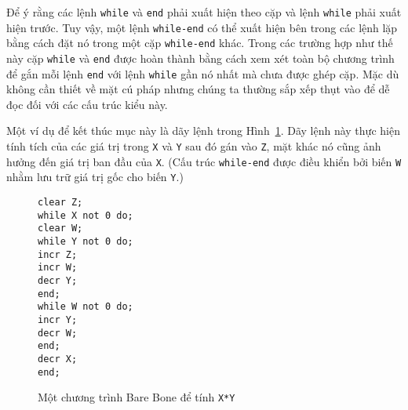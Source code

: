 Để ý rằng các lệnh \texttt{while} và \texttt{end} phải xuất hiện theo cặp và lệnh
\texttt{while} phải xuất hiện trước. Tuy vậy, một lệnh \texttt{while-end} có thể xuất hiện
bên trong các lệnh lặp bằng cách đặt nó trong một cặp \texttt{while-end} khác. Trong các
trường hợp như thế này cặp \texttt{while} và \texttt{end} được hoàn thành bằng cách xem
xét toàn bộ chương trình để gắn mỗi lệnh \texttt{end} với lệnh \texttt{while} gần nó nhất
mà chưa được ghép cặp. Mặc dù không cần thiết về mặt cú pháp nhưng chúng ta thường sắp xếp
thụt vào để dễ đọc đối với các cấu trúc kiểu này.


Một ví dụ để kết thúc mục này là dãy lệnh trong Hình~\ref{fig:fig114}. Dãy lệnh này thực
hiện tính tích của các giá trị trong \texttt{X} và \texttt{Y} sau đó gán vào \texttt{Z},
mặt khác nó cũng ảnh hưởng đến giá trị ban đầu của \texttt{X}. (Cấu trúc
\texttt{while-end} được điều khiển bởi biến \texttt{W} nhằm lưu trữ giá trị gốc cho biến
\texttt{Y}.)

\begin{figure}[tbh]
  \begin{flushleft}
    \qquad \qquad\qquad  \texttt{clear Z;}\\
    \qquad \qquad\qquad \texttt{while X not 0 do;} \\
    \qquad \qquad\qquad \qquad \texttt{clear W;} \\
    \qquad \qquad\qquad \qquad \texttt{while Y not 0 do;} \\
    \qquad \qquad\qquad \qquad \qquad \texttt{incr Z;} \\
    \qquad \qquad\qquad \qquad \qquad \texttt{incr W;} \\
    \qquad \qquad\qquad \qquad \qquad \texttt{decr Y;} \\
    \qquad \qquad\qquad \qquad \texttt{end;} \\
    \qquad \qquad\qquad \qquad \texttt{while W not 0 do;} \\
    \qquad \qquad\qquad \qquad \qquad \texttt{incr Y;}\\
    \qquad \qquad\qquad \qquad \qquad \texttt{decr W;}\\
    \qquad \qquad\qquad \qquad \texttt{end;} \\
    \qquad \qquad\qquad \qquad \texttt{decr X;} \\
    \qquad\qquad\qquad\texttt{end;}
\end{flushleft}
  \caption{Một chương trình Bare Bone để tính \texttt{X*Y}}
  \label{fig:fig114}
\end{figure}

